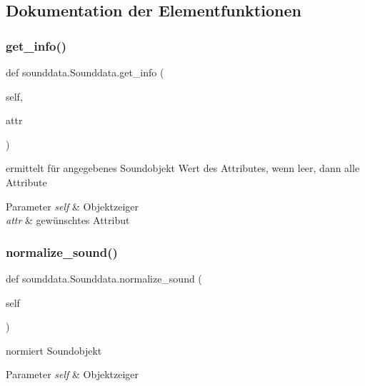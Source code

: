 \subsection{Dokumentation der Elementfunktionen}
\mbox{\label{classsounddata_1_1_sounddata_ac63cbec499bc5b28eced6ff6d0187376}} 
\subsubsection{\texorpdfstring{get\+\_\+info()}{get\_info()}}
{\footnotesize\ttfamily def sounddata.\+Sounddata.\+get\+\_\+info (\begin{DoxyParamCaption}\item[{}]{self,  }\item[{}]{attr }\end{DoxyParamCaption})}



ermittelt für angegebenes Soundobjekt Wert des Attributes, wenn leer, dann alle Attribute 


\begin{DoxyParams}{Parameter}
{\em self} & Objektzeiger \\
\hline
{\em attr} & gewünschtes Attribut \\
\hline
\end{DoxyParams}
\mbox{\label{classsounddata_1_1_sounddata_a623c2b2a5e126347893864ffc09246d6}} 
\subsubsection{\texorpdfstring{normalize\+\_\+sound()}{normalize\_sound()}}
{\footnotesize\ttfamily def sounddata.\+Sounddata.\+normalize\+\_\+sound (\begin{DoxyParamCaption}\item[{}]{self }\end{DoxyParamCaption})}



normiert Soundobjekt 


\begin{DoxyParams}{Parameter}
{\em self} & Objektzeiger \\
\hline
\end{DoxyParams}
\mbox{\label{classsounddata_1_1_sounddata_aacf5b956e13132ce48a550852b6e9a96}} 
